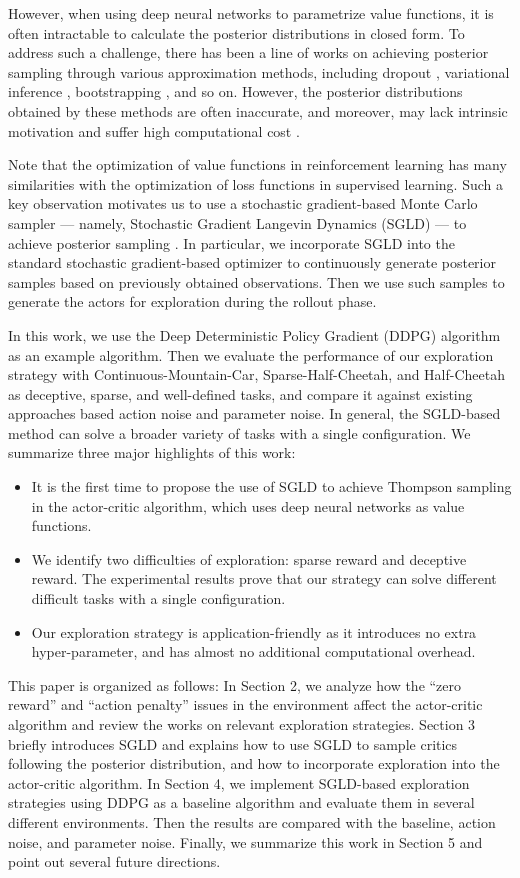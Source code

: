 However, when using deep neural networks to parametrize value functions, it is often intractable to calculate the posterior distributions in closed form. To address such a challenge, there has been a line of works on achieving posterior sampling through various approximation methods, including dropout \cite{dropoutInference}, variational inference \cite{VIME}, bootstrapping \cite{BDQN}, and so on. However, the posterior distributions obtained by these methods are often inaccurate, and moreover, may lack intrinsic motivation and suffer high computational cost \cite{osband2018randomized}.

Note that the optimization of value functions in reinforcement learning has many similarities with the optimization of loss functions in supervised learning. Such a key observation motivates us to use a stochastic gradient-based Monte Carlo sampler --- namely, Stochastic Gradient Langevin Dynamics (SGLD) --- to achieve posterior sampling \cite{SGLD}. In particular, we incorporate SGLD into the standard stochastic gradient-based optimizer to continuously generate posterior samples based on previously obtained observations. Then we use such samples to generate the actors for exploration during the rollout phase.

In this work, we use the Deep Deterministic Policy Gradient (DDPG) algorithm \cite{DDPG} as an example algorithm. Then we evaluate the performance of our exploration strategy with Continuous-Mountain-Car, Sparse-Half-Cheetah, and Half-Cheetah as deceptive, sparse, and well-defined tasks, and compare it against existing approaches based action noise and parameter noise. In general, the SGLD-based method can solve a broader variety of tasks with a single configuration. We summarize three major highlights of this work:
\begin{itemize}
\item  It is the first time to propose the use of SGLD to achieve Thompson sampling in the actor-critic algorithm, which uses deep neural networks as value functions.
\item We identify two difficulties of exploration: sparse reward and deceptive reward. The experimental results prove that our strategy can solve different difficult tasks with a single configuration.
\item  Our exploration strategy is application-friendly as it introduces no extra hyper-parameter, and has almost no additional computational overhead. 
\end{itemize} 

This paper is organized as follows: In Section 2, we analyze how the “zero reward” and “action penalty” issues in the environment affect the actor-critic algorithm and review the works on relevant exploration strategies. Section 3 briefly introduces SGLD and explains how to use SGLD to sample critics following the posterior distribution, and how to incorporate exploration into the actor-critic algorithm. In Section 4, we implement SGLD-based exploration strategies using DDPG as a baseline algorithm and evaluate them in several different environments. Then the results are compared with the baseline, action noise, and parameter noise. Finally, we summarize this work in Section 5 and point out several future directions.
